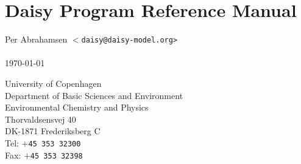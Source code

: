 
\thispagestyle{empty}
\chapter*{Daisy Program Reference Manual}

\begin{bf}
  \begin{large}
    Per Abrahamsen \texttt{$<$daisy@daisy-model.org>}\\
    \\
    \today{}\\
  \end{large}
\end{bf}
\vfill\noindent
University of Copenhagen\\
Department of Basic Sciences and Environment\\
Environmental Chemistry and Physics\\
Thorvaldsensvej 40\\
DK-1871 Frederiksberg C\\
Tel: \texttt{$+$45 353 32300}\\
Fax: \texttt{$+$45 353 32398}


